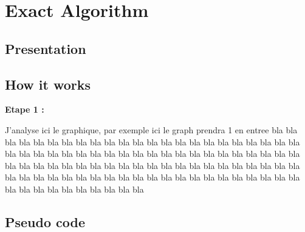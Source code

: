 
\section{Exact Algorithm}


    \subsection{Presentation}


\subsection{How it works}

    \hspace*{1cm} \textbf{Etape 1 :}
    \\
    \begin{minipage}{0.5\textwidth}
    \end{minipage}
    \begin{minipage}{0.5\textwidth}
            J'analyse ici le graphique, par exemple ici le graph prendra 1 en entree bla bla bla bla bla bla bla bla bla bla bla bla bla bla bla bla bla bla bla bla bla bla bla bla bla bla bla bla bla bla bla bla bla bla bla bla bla bla bla bla bla bla bla bla bla bla bla bla bla bla bla bla bla bla bla bla bla bla bla bla bla bla bla bla bla bla bla bla bla bla bla bla bla bla bla bla bla bla bla bla bla bla bla bla bla bla bla bla bla bla bla bla bla bla bla bla
    \end{minipage}


\subsection{Pseudo code}

